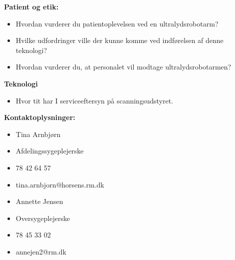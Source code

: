 \textbf{Patient og etik:}
\begin{itemize}
\item Hvordan vurderer du patientoplevelsen ved en ultralydsrobotarm?
\item Hvilke udfordringer ville der kunne komme ved indførelsen af denne teknologi? 
\item Hvordan vurderer du, at personalet vil modtage ultralydsrobotarmen?
\end{itemize}
\textbf{Teknologi}
\begin{itemize}
\item Hvor tit har I serviceeftersyn på scanningsudstyret.
\end{itemize}
\textbf{Kontaktoplysninger:}
\begin{itemize}
\item Tina Arnbjørn
\item Afdelingssygeplejerske
\item 78 42 64 57
\item tina.arnbjorn@horsens.rm.dk
\end{itemize}
\begin{itemize}
\item Annette Jensen
\item Oversygeplejerske
\item 78 45 33 02
\item annejen2@rm.dk
\end{itemize}
\newpage